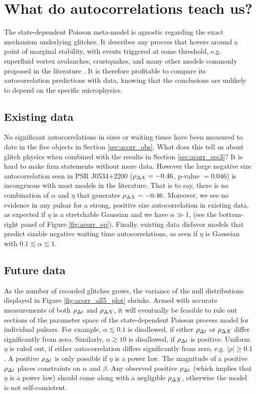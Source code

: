 \section{What do autocorrelations teach us?}
\label{sec:acorr_discussion}
The state-dependent Poisson meta-model is agnostic regarding the exact mechanism underlying glitches. It describes any process that hovers around a point of marginal stability, with events triggered at some threshold, e.g. superfluid vortex avalanches, crustquakes, and many other models commonly proposed in the literature \citep{Haskell2015}. It is therefore profitable to compare its autocorrelation predictions with data, knowing that the conclusions are unlikely to depend on the specific microphysics.
 
\subsection{Existing data}
No significant autocorrelations in sizes or waiting times have been measured to date in the five objects in Section \ref{sec:acorr_obs}. What does this tell us about glitch physics when combined with the results in Section \ref{sec:acorr_sec3}? It is hard to make firm statements without more data. However the large negative size autocorrelation seen in PSR J0534$+$2200 ($\rho_{\Delta X}=-0.46$, p-value $=0.046$) is incongruous with most models in the literature. That is to say, there is no combination of $\alpha$ and $\eta$ that generates $\rho_{\Delta X} =-0.46$. Moreover, we see no evidence in any pulsar for a strong, positive size autocorrelation in existing data, as expected if $\eta$ is a stretchable Gaussian and we have $\alpha \gg 1$, (see the bottom-right panel of Figure \ref{fig:acorr_sp}). Finally, existing data disfavor models that predict sizable negative waiting time autocorrelations, as seen if $\eta$ is Gaussian with $0.1 \lesssim \alpha \lesssim 1$.

\subsection{Future data}
As the number of recorded glitches grows, the variance of the null distributions displayed in Figure \ref{fig:acorr_all5_plot} shrinks. Armed with accurate measurements of both $\rho_{\Delta t}$ and $\rho_{\Delta X}$, it will eventually be feasible to rule out sections of the parameter space of the state-dependent Poisson process model for individual pulsars. For example, $\alpha \lesssim 0.1$ is disallowed, if either $\rho_{\Delta t}$ or $\rho_{\Delta X}$ differ significantly from zero. Similarly, $\alpha \gtrsim 10$ is disallowed, if $\rho_{\Delta t}$ is positive. Uniform $\eta$ is ruled out, if either autocorrelation differs significantly from zero, e.g. $|\rho| \geq 0.1$. A positive $\rho_{\Delta t}$ is only possible if $\eta$ is a power law. The magnitude of a positive $\rho_{\Delta t}$ places constraints on $\alpha$ and $\beta$. Any observed positive $\rho_{\Delta t}$ (which implies that $\eta$ is a power law) should come along with a negligible $\rho_{\Delta X}$, otherwise the model is not self-consistent.

